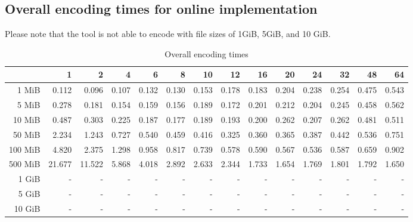 \subsection{Overall encoding times for online implementation \cite{HuffmanCodingMPICUDA}}

Please note that the tool is not able to encode with file sizes of 1GiB, 5GiB, and 10 GiB.

\begin{table}[!h]
	\centering
	\caption{Overall encoding times}
	\begin{tabular}{rrrrrrrrrrrrrr}
		\toprule
		\diagbox[width=7em]{Size}{Threads} & 1 & 2 & 4 & 6 & 8 & 10 & 12 & 16 & 20 & 24 & 32 & 48 & 64 \\
        \midrule
        1 MiB & 0.112 & 0.096 & 0.107 & 0.132 & 0.130 & 0.153 & 0.178 & 0.183 & 0.204 & 0.238 & 0.254 & 0.475 & 0.543 \\
        5 MiB & 0.278 & 0.181 & 0.154 & 0.159 & 0.156 & 0.189 & 0.172 & 0.201 & 0.212 & 0.204 & 0.245 & 0.458 & 0.562 \\
        10 MiB & 0.487 & 0.303 & 0.225 & 0.187 & 0.177 & 0.189 & 0.193 & 0.200 & 0.262 & 0.207 & 0.262 & 0.481 & 0.511 \\
        50 MiB & 2.234 & 1.243 & 0.727 & 0.540 & 0.459 & 0.416 & 0.325 & 0.360 & 0.365 & 0.387 & 0.442 & 0.536 & 0.751 \\
        100 MiB & 4.820 & 2.375 & 1.298 & 0.958 & 0.817 & 0.739 & 0.578 & 0.590 & 0.567 & 0.536 & 0.587 & 0.659 & 0.902 \\
        500 MiB & 21.677 & 11.522 & 5.868 & 4.018 & 2.892 & 2.633 & 2.344 & 1.733 & 1.654 & 1.769 & 1.801 & 1.792 & 1.650 \\
        1 GiB & - & - & - & - & - & - & - & - & - & - & - & - & - \\
        5 GiB & - & - & - & - & - & - & - & - & - & - & - & - & - \\
        10 GiB & - & - & - & - & - & - & - & - & - & - & - & - & - \\
		\bottomrule
	\end{tabular}
\end{table}

